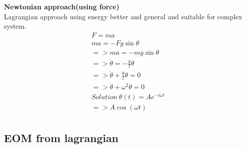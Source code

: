 	\textbf{Newtonian approach(using force)} \\
	Lagrangian approach using energy better and general and suitable for complex system.\\
	\begin{align}
		F = ma \\
		ma = -Fg \sin\theta \\
		=>ma = -mg\sin\theta \\
		=>\ddot{\theta} = - \frac{g}{l}\theta \\
		=>\ddot{\theta}+\frac{\theta}{l}\theta = 0 \\
		=>\ddot{\theta}+\omega^2\theta=0 \\
		Solution\ \theta(t) = Ae^{-i\omega t} \\
		=> A \cos(\omega t) \\
	\end{align}
	
	
	



\subsection{EOM from lagrangian}








